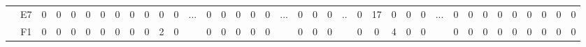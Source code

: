 \documentclass[12pt]{article}
\begin{document}
\begin{table}[!ht]
{\begin{tabular}{cccccccccccccccccccccccccccccccccccccc}
\multicolumn{1}{c|}{}                       & \multicolumn{1}{c|}{E7}  & \multicolumn{1}{c|}{0}  & \multicolumn{1}{c|}{0}  & \multicolumn{1}{c|}{0}  & \multicolumn{1}{c|}{0}  & \multicolumn{1}{c|}{0}  & \multicolumn{1}{c|}{0}  & \multicolumn{1}{c|}{0}  & \multicolumn{1}{c|}{0}  & \multicolumn{1}{c|}{0}  & \multicolumn{1}{c|}{0}  & \multicolumn{1}{c|}{\multirow{3}{*}{...}} & \multicolumn{1}{c|}{0}  & \multicolumn{1}{c|}{0}  & \multicolumn{1}{c|}{0}  & \multicolumn{1}{c|}{0}  & \multicolumn{1}{c|}{0}  & \multicolumn{1}{c|}{\multirow{3}{*}{...}} & \multicolumn{1}{c|}{0}  & \multicolumn{1}{c|}{0}  & \multicolumn{1}{c|}{0}  & \multicolumn{1}{c|}{\multirow{3}{*}{..}}  & \multicolumn{1}{c|}{0}  & \multicolumn{1}{c|}{17} & \multicolumn{1}{c|}{0}  & \multicolumn{1}{c|}{0}  & \multicolumn{1}{c|}{0}  & \multicolumn{1}{c|}{\multirow{3}{*}{...}} & \multicolumn{1}{c|}{0}  & \multicolumn{1}{c|}{0}  & \multicolumn{1}{c|}{0}  & \multicolumn{1}{c|}{0}  & \multicolumn{1}{c|}{0}  & \multicolumn{1}{c|}{0}  & \multicolumn{1}{c|}{0}  & \multicolumn{1}{c|}{0}  & \multicolumn{1}{c|}{0}  \\ \cline{2-12} \cline{14-18} \cline{20-22} \cline{24-28} \cline{30-38} 
\multicolumn{1}{c|}{}                       & \multicolumn{1}{c|}{F1}  & \multicolumn{1}{c|}{0}  & \multicolumn{1}{c|}{0}  & \multicolumn{1}{c|}{0}  & \multicolumn{1}{c|}{0}  & \multicolumn{1}{c|}{0}  & \multicolumn{1}{c|}{0}  & \multicolumn{1}{c|}{0}  & \multicolumn{1}{c|}{0}  & \multicolumn{1}{c|}{2}  & \multicolumn{1}{c|}{0}  & \multicolumn{1}{c|}{}                     & \multicolumn{1}{c|}{0}  & \multicolumn{1}{c|}{0}  & \multicolumn{1}{c|}{0}  & \multicolumn{1}{c|}{0}  & \multicolumn{1}{c|}{0}  & \multicolumn{1}{c|}{}                     & \multicolumn{1}{c|}{0}  & \multicolumn{1}{c|}{0}  & \multicolumn{1}{c|}{0}  & \multicolumn{1}{c|}{}                     & \multicolumn{1}{c|}{0}  & \multicolumn{1}{c|}{0}  & \multicolumn{1}{c|}{4}  & \multicolumn{1}{c|}{0}  & \multicolumn{1}{c|}{0}  & \multicolumn{1}{c|}{}                     & \multicolumn{1}{c|}{0}  & \multicolumn{1}{c|}{0}  & \multicolumn{1}{c|}{0}  & \multicolumn{1}{c|}{0}  & \multicolumn{1}{c|}{0}  & \multicolumn{1}{c|}{0}  & \multicolumn{1}{c|}{0}  & \multicolumn{1}{c|}{0}  & \multicolumn{1}{c|}{0}  \\ \cline{2-12} \cline{14-18} \cline{20-22} \cline{24-28} \cline{30-38} 

\end{tabular}}
\end{table}
\end{document}
